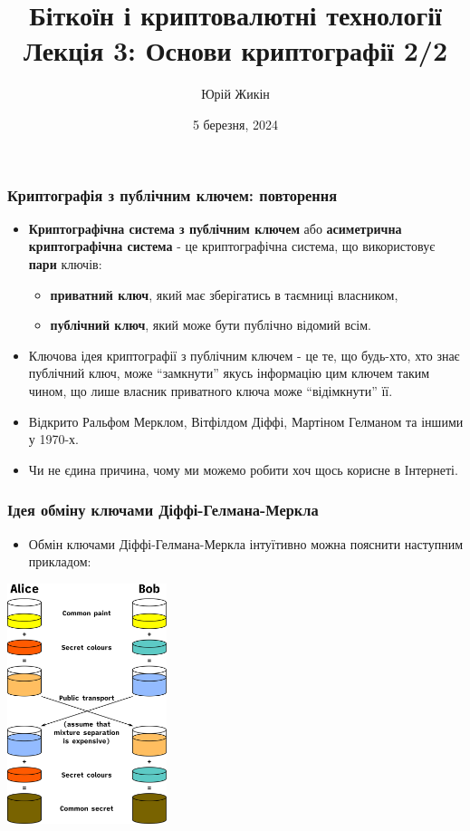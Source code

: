 \documentclass{beamer}
\title{
  Біткоїн і криптовалютні технології \\
  Лекція 3: Основи криптографії 2/2
}
\author{Юрій Жикін}
\date{5 березня, 2024}
\begin{document}
\frame{\titlepage}

\begin{frame}
  \frametitle{Криптографія з публічним ключем: повторення}
  \begin{itemize}
  \item \textbf{Криптографічна система з публічним ключем} або \textbf{асиметрична
      криптографічна система} - це 
    криптографічна система, що використовує \textbf{пари} ключів:
    \begin{itemize}
    \item \textbf{приватний ключ}, який має зберігатись в таємниці власником,
    \item \textbf{публічний ключ}, який може бути публічно відомий всім.
    \end{itemize}
  \item Ключова ідея криптографії з публічним ключем - це те, що будь-хто, хто
    знає публічний ключ, може ``замкнути'' якусь інформацію цим ключем таким
    чином, що лише власник приватного ключа може ``відімкнути'' її.
  \item Відкрито Ральфом Мерклом, Вітфілдом Діффі, Мартіном Гелманом та іншими у
    1970-х.
  \item Чи не єдина причина, чому ми можемо робити хоч щось корисне в Інтернеті.
  \end{itemize}
\end{frame}

\begin{frame}
  \frametitle{Ідея обміну ключами Діффі-Гелмана-Меркла}
  \begin{itemize}
  \item Обмін ключами Діффі-Гелмана-Меркла інтуїтивно можна пояснити наступним
    прикладом:
  \end{itemize}
  \begin{center}
    \includegraphics[width=0.35\textwidth]{dh}
  \end{center}
\end{frame}
\end{document}
